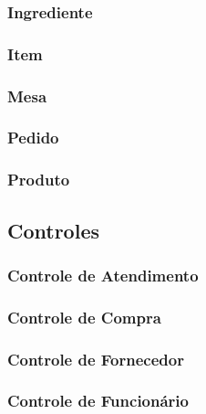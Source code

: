 \subsubsection{Ingrediente}

\subsubsection{Item}

\subsubsection{Mesa}

\subsubsection{Pedido}

\subsubsection{Produto}


\subsection{Controles}

\subsubsection{Controle de Atendimento}

\subsubsection{Controle de Compra}

\subsubsection{Controle de Fornecedor}

\subsubsection{Controle de Funcionário}

